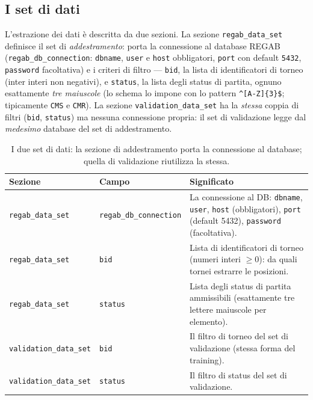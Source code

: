 \subsection{I set di dati}

L'estrazione dei dati è descritta da due sezioni. La sezione
\texttt{regab\_data\_set} definisce il set di \emph{addestramento}: porta la
connessione al database REGAB (\texttt{regab\_db\_connection}:
\texttt{dbname}, \texttt{user} e \texttt{host} obbligatori,
\texttt{port} con default \texttt{5432}, \texttt{password} facoltativa) e i
criteri di filtro — \texttt{bid}, la lista di identificatori di torneo
(inter interi non negativi), e \texttt{status}, la lista degli status di
partita, ognuno esattamente \emph{tre maiuscole} (lo schema lo impone con lo
pattern \texttt{\textasciicircum[A-Z]\{3\}\$}; tipicamente \texttt{CMS} e \texttt{CMR}). La
sezione \texttt{validation\_data\_set} ha la \emph{stessa} coppia di filtri
(\texttt{bid}, \texttt{status}) ma nessuna connessione propria: il set di
validazione legge dal \emph{medesimo} database del set di addestramento.

\begin{table}[htbp]
\centering
\small
\begin{tabularx}{\textwidth}{@{}llX@{}}
\toprule
Sezione & Campo & Significato \\
\midrule
\texttt{regab\_data\_set}   & \texttt{regab\_db\_connection} & La connessione al DB: \texttt{dbname}, \texttt{user}, \texttt{host} (obbligatori), \texttt{port} (default 5432), \texttt{password} (facoltativa). \\
\texttt{regab\_data\_set}   & \texttt{bid}   & Lista di identificatori di torneo (numeri interi $\ge 0$): da quali tornei estrarre le posizioni. \\
\texttt{regab\_data\_set}   & \texttt{status} & Lista degli status di partita ammissibili (esattamente tre lettere maiuscole per elemento). \\
\texttt{validation\_data\_set} & \texttt{bid} & Il filtro di torneo del set di validazione (stessa forma del training). \\
\texttt{validation\_data\_set} & \texttt{status} & Il filtro di status del set di validazione. \\
\bottomrule
\end{tabularx}
\caption{I due set di dati: la sezione di addestramento porta la connessione al database; quella di validazione riutilizza la stessa.}
\label{tab:setup-datasets}
\end{table}

